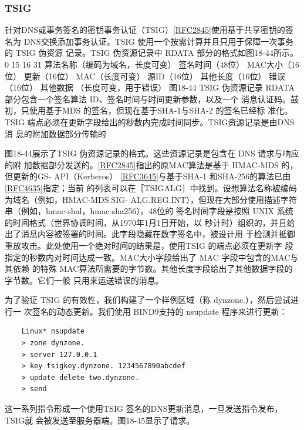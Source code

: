 \subsubsection{TSIG}
针对DNS或事务签名的密钥事务认证（TSIG）\href{https://www.rfc-editor.org/rfc/rfc2845}{[RFC2845]}使用基于共享密钥的签名为
DNS交换添加事务认证。TSIG 使用一个按需计算并且只用于保障一次事务的 TSIG 伪资源
记录。TSIG 伪资源记录中 RDATA 部分的格式如图18-44所示。
0
15 16
31
算法名称（编码为域名，长度可变）
签名时间（48位）
MAC大小（16位）
更新（16位）
MAC（长度可变）
源ID（16位）
其他长度（16位）
错误（16位）
其他数据
（长度可变，用于错误）
图18-44
TSIG 伪资源记录 RDATA 部分包含一个签名算法 ID、签名时间与时间更新参数，以及一个
消息认证码。鼓初，只使用基于MDS 的签名，但现在基于SHA-1与SHA-2 的签名已经标
准化。TSIG 端点必须在更新字段给出的秒数内完成时间同步。TSIG资源记录是由DNS消
息的附加数据部分传输的

图18-44展示了TSIG 伪资源记录的格式。这些资源记录是包含在 DNS 请求与响应的附
加数据部分发送的。\href{https://www.rfc-editor.org/rfc/rfc2845}{[RFC2845]}指出的原MAC算法是基于 HMAC-MDS 的，但更新的GS-
API（Kerberos） \href{https://www.rfc-editor.org/rfc/rfc3645}{[RFC3645]}与基于SHA-1 和SHA-256的算法已由\href{https://www.rfc-editor.org/rfc/rfc4635}{[RFC4635]}指定；当前
的列表可以在［TSIGALG］中找到。设想算法名称被编码为域名（例如，HMAC-MDS.SIG-
ALG.REG.INT），但现在大部分使用描述字符串（例如，hmac-shal，hmac-sha256）。48位的
签名时间字段是按照 UNIX 系统的时间格式（世界协调时间，从1970年1月1日开始，以
秒计时）组织的，并且给出了消息内容被签署的时间。此字段隐藏在数字签名中，被设计用
于检测并抵御重放攻击。此处使用一个绝对时间的结果是，使用TSIG 的端点必须在更新字
段指定的秒数内对时间达成一致。MAC大小字段给出了 MAC 字段中包含的MAC与其依赖
的特殊 MAC算法所需要的字节数。其他长度字段给出了其他数据字段的字节数。它们一般
只用来运送错误的消息。

为了验证 TSIG 的有效性，我们构建了一个样例区域（称 dynzone.），然后尝试进行一
次签名的动态更新。我们使用 BIND9支持的 nsupdate 程序来进行更新：
\begin{verbatim}
    Linux* nsupdate
    > zone dynzone.
    > server 127.0.0.1
    > key tsigkey.dynzone. 1234567890abcdef
    > update delete two.dynzone.
    > send
\end{verbatim}
这一系列指令形成一个使用TSIG 签名的DNS更新消息，一旦发送指令发布，TSIG就
会被发送至服务器端。图18-45显示了请求。

